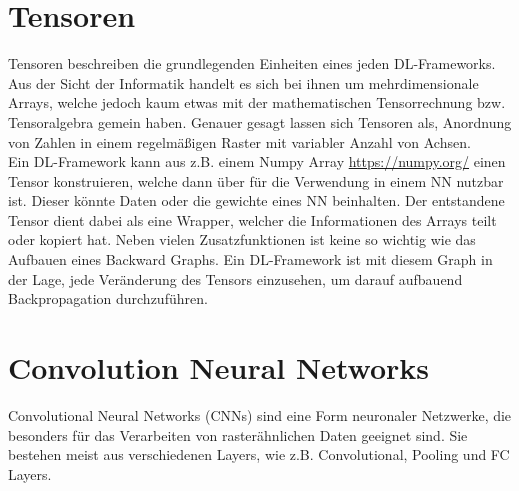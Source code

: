 \section{Tensoren}
Tensoren beschreiben die grundlegenden Einheiten eines jeden DL-Frameworks. Aus der Sicht der Informatik handelt es sich bei ihnen um mehrdimensionale Arrays, welche jedoch kaum etwas mit der mathematischen Tensorrechnung bzw. Tensoralgebra gemein haben. \cite[S. 67]{DRL_Lapan}
Genauer gesagt lassen sich Tensoren als, Anordnung von Zahlen in einem regelmäßigen Raster mit variabler Anzahl von Achsen. \cite[S. 35]{DL}\\
Ein DL-Framework kann aus z.B. einem Numpy Array \url{https://numpy.org/} einen Tensor konstruieren, welche dann über für die Verwendung in einem NN nutzbar ist. Dieser könnte Daten oder die gewichte eines NN beinhalten. Der entstandene Tensor dient dabei als eine Wrapper, welcher die Informationen des Arrays teilt oder kopiert hat. Neben vielen Zusatzfunktionen ist keine so wichtig wie das Aufbauen eines Backward Graphs. Ein DL-Framework ist mit diesem Graph in der Lage, jede Veränderung des Tensors einzusehen, um darauf aufbauend Backpropagation durchzuführen. \cite[S. 72 ff.]{DRL_Lapan}

\section{Convolution Neural Networks} \label{sec:Anhang_CNN}
Convolutional Neural Networks (CNNs) sind eine Form neuronaler Netzwerke, die besonders für das Verarbeiten von rasterähnlichen Daten geeignet sind. Sie bestehen meist aus verschiedenen Layers, wie z.B. Convolutional, Pooling und FC Layers.

